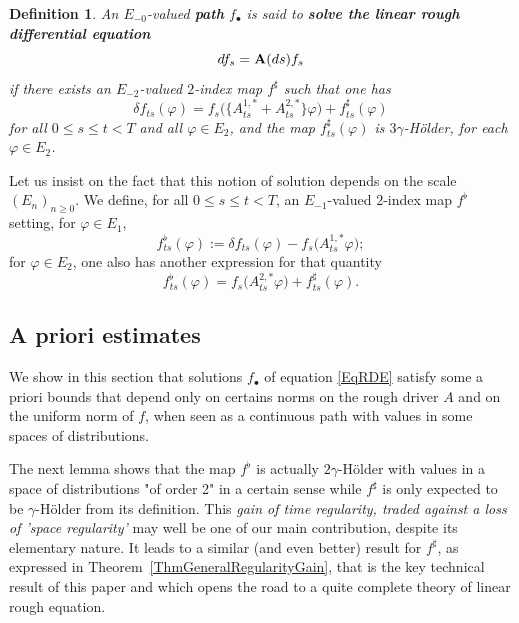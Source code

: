 \documentclass[11pt,a4paper]{amsart}
\renewcommand{\leq}{\leqslant}
\renewcommand{\geq}{\geqslant}
\newcommand{\ssk}{\smallskip}
\newtheorem{defn}[thm]{ \hspace{-0.3cm} {\sc Definition}}%
\numberwithin{equation}{section} %
\begin{document}
\begin{defn}
\label{DefnSolutionEquation}
An $E_{-0}$-valued \emph{\textbf{path}} $f_\bullet$ is said to \emph{\textbf{solve the linear rough differential equation}}
\begin{equation}
\label{EqRDE}
df_s = {\bf A}(ds)f_s
\end{equation}
if there exists an $E_{-2}$-valued $2$-index map $f^\sharp$ such that one has
\begin{equation}
\label{EqDefnSolutionRDE}
\delta f_{ts}(\varphi) = f_s\Big(\big\{A^{1,*}_{ts}+A^{2,*}_{ts}\big\}\varphi\Big) + f^\sharp_{ts}(\varphi)
\end{equation}
for all $0\leq s\leq t<T$ and all $\varphi\in E_2$, and the map $f^\sharp_{ts}(\varphi)$ is $3\gamma$-H\"older, for each $\varphi\in E_2$.
\end{defn}

\ssk

Let us insist on the fact that this notion of solution depends on the scale $(E_n)_{n\geq 0}$. We define, for all $0\leq s\leq t<T$, an  $E_{-1}$-valued $2$-index map $f^\flat$ setting, for $\varphi\in E_1$,
\begin{equation*}
f^\flat_{ts}(\varphi) := \delta f_{ts}(\varphi) - f_s\big(A_{ts}^{1,*} \varphi\big);
\end{equation*}
for $\varphi\in E_2$, one also has another expression for that quantity
$$
f^\flat_{ts}(\varphi) = f_s\big(A^{2,*}_{ts}\varphi\big) + f^\sharp_{ts}(\varphi).
$$


\bigskip


\subsection{A priori estimates}
\label{SubsectionAPrioriEstimates}

We show in this section that solutions $f_\bullet$ of equation \eqref{EqRDE} satisfy some a priori bounds that depend only on certains norms on the rough driver $A$ and on the uniform norm of $f$, when seen as a continuous path with values in some spaces of distributions. 

\ssk

The next lemma shows that the map $f^\flat$ is actually $2\gamma$-H\"older with values in a  space of distributions "of order 2" in a certain sense while $f^\sharp$ is only expected to be $\gamma$-H\"older from its definition. This \textit{gain of time regularity, traded against a loss of 'space regularity'} may well be one of our main contribution, despite its elementary nature. It leads to a similar (and even better) result for $f^\sharp$, as expressed in Theorem~\ref{ThmGeneralRegularityGain}, that is the key technical result of this paper and which opens the road  to a quite complete theory of linear rough equation.
\end{document}
